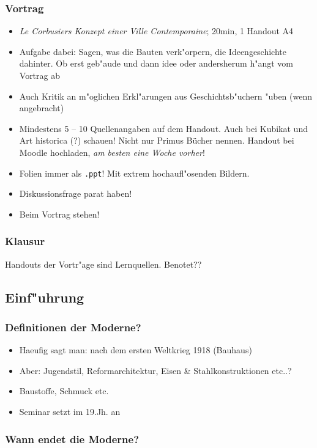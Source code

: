 \documentclass[]{scrartcl}
\begin{document}
\subsubsection{Vortrag}

\begin{itemize}
    \item \emph{Le Corbusiers Konzept einer Ville Contemporaine}; 20min, 1 Handout A4
    \item Aufgabe dabei: Sagen, was die Bauten verk"orpern, die Ideengeschichte dahinter. Ob erst geb"aude und dann idee oder andersherum h"angt vom Vortrag ab
    \item Auch Kritik an m"oglichen Erkl"arungen aus Geschichtsb"uchern "uben (wenn angebracht)
    \item Mindestens 5 -- 10 Quellenangaben auf dem Handout. Auch bei Kubikat und Art historica (?) schauen! Nicht nur Primus Bücher nennen. Handout bei Moodle hochladen, \emph{am besten eine Woche vorher}! 
    \item Folien immer als \texttt{.ppt}! Mit extrem hochaufl"osenden Bildern.
    \item Diskussionsfrage parat haben!
    \item Beim Vortrag stehen!
\end{itemize}



\subsubsection{Klausur}
Handouts der Vortr"age sind Lernquellen.
Benotet??

\subsection{Einf"uhrung}
\subsubsection{Definitionen der Moderne?}
\begin{itemize}
    \item Haeufig sagt man: nach dem ersten Weltkrieg 1918 (Bauhaus)
    \item Aber: Jugendstil, Reformarchitektur, Eisen \& Stahlkonstruktionen etc..?
    \item Baustoffe, Schmuck etc.
    \item Seminar setzt im 19.Jh. an
\end{itemize}

\subsubsection{Wann endet die Moderne?}
\end{document}
